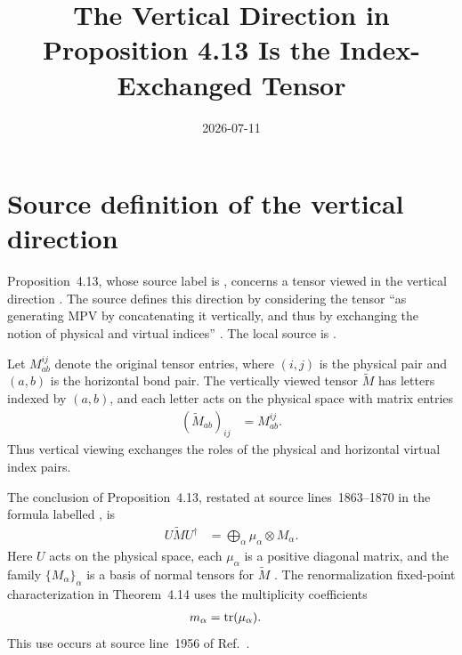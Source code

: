 \documentclass{article}
\title{The Vertical Direction in Proposition 4.13 Is the Index-Exchanged Tensor}
\author{}
\date{2026-07-11}
\begin{document}
\maketitle
{}

\section{Source definition of the vertical direction}

Proposition~4.13, whose source label is , concerns a tensor
viewed in the vertical direction
\cite[Proposition~4.13]{Cirac2016MPDO_arXiv}. The source defines this direction
by considering the tensor ``as generating MPV by concatenating it vertically,
and thus by exchanging the notion of physical and virtual indices''
\cite[line~943]{Cirac2016MPDO_arXiv}. The local source is
.

Let $M^{ij}_{ab}$ denote the original tensor entries, where $(i,j)$ is the
physical pair and $(a,b)$ is the horizontal bond pair. The vertically viewed
tensor $\widetilde M$ has letters indexed by $(a,b)$, and each letter acts on
the physical space with matrix entries
\begin{align}
    (\widetilde M_{ab})_{ij}
        &=M^{ij}_{ab}.
    \label{eq:cpgsv17_vertical_tensor_definition_vertical_letters}
\end{align}
Thus vertical viewing exchanges the roles of the physical and horizontal
virtual index pairs.

The conclusion of Proposition~4.13, restated at source lines~1863--1870 in the
formula labelled , is
\begin{align}
    U\widetilde M U^\dagger
        &=
        \bigoplus_\alpha\mu_\alpha\otimes M_\alpha.
    \label{eq:cpgsv17_vertical_tensor_definition_vertical_canonical_form}
\end{align}
Here $U$ acts on the physical space, each $\mu_\alpha$ is a positive diagonal
matrix, and the family $\{M_\alpha\}_\alpha$ is a basis of normal tensors for
$\widetilde M$ \cite[Proposition~4.13]{Cirac2016MPDO_arXiv}. The
renormalization fixed-point characterization in Theorem~4.14 uses the
multiplicity coefficients
\begin{align}
    m_\alpha
        &=\operatorname{tr}(\mu_\alpha).
    \label{eq:cpgsv17_vertical_tensor_definition_multiplicity_coefficient}
\end{align}
This use occurs at source line~1956 of
Ref.~\cite{Cirac2016MPDO_arXiv}.
\end{document}
